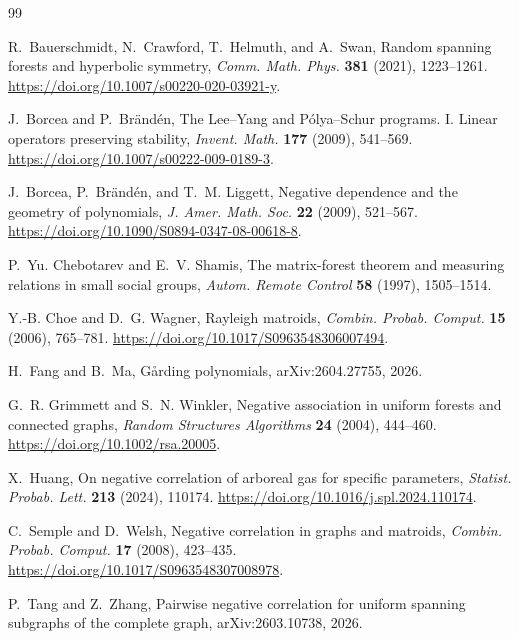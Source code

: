 \documentclass[11pt]{article}
\numberwithin{equation}{section}
\begin{document}
\begin{thebibliography}{99}

R.~Bauerschmidt, N.~Crawford, T.~Helmuth, and A.~Swan,
\newblock Random spanning forests and hyperbolic symmetry,
\newblock \emph{Comm. Math. Phys.} \textbf{381} (2021), 1223--1261.
\newblock \url{https://doi.org/10.1007/s00220-020-03921-y}.

J.~Borcea and P.~Br\"and\'en,
\newblock The Lee--Yang and P\'olya--Schur programs. I. Linear operators preserving stability,
\newblock \emph{Invent. Math.} \textbf{177} (2009), 541--569.
\newblock \url{https://doi.org/10.1007/s00222-009-0189-3}.

J.~Borcea, P.~Br\"and\'en, and T.~M. Liggett,
\newblock Negative dependence and the geometry of polynomials,
\newblock \emph{J. Amer. Math. Soc.} \textbf{22} (2009), 521--567.
\newblock \url{https://doi.org/10.1090/S0894-0347-08-00618-8}.

P.~Yu. Chebotarev and E.~V. Shamis,
\newblock The matrix-forest theorem and measuring relations in small social groups,
\newblock \emph{Autom. Remote Control} \textbf{58} (1997), 1505--1514.

Y.-B. Choe and D.~G. Wagner,
\newblock Rayleigh matroids,
\newblock \emph{Combin. Probab. Comput.} \textbf{15} (2006), 765--781.
\newblock \url{https://doi.org/10.1017/S0963548306007494}.

H.~Fang and B.~Ma,
\newblock G{\aa}rding polynomials,
\newblock arXiv:2604.27755, 2026.

G.~R. Grimmett and S.~N. Winkler,
\newblock Negative association in uniform forests and connected graphs,
\newblock \emph{Random Structures Algorithms} \textbf{24} (2004), 444--460.
\newblock \url{https://doi.org/10.1002/rsa.20005}.

X.~Huang,
\newblock On negative correlation of arboreal gas for specific parameters,
\newblock \emph{Statist. Probab. Lett.} \textbf{213} (2024), 110174.
\newblock \url{https://doi.org/10.1016/j.spl.2024.110174}.

C.~Semple and D.~Welsh,
\newblock Negative correlation in graphs and matroids,
\newblock \emph{Combin. Probab. Comput.} \textbf{17} (2008), 423--435.
\newblock \url{https://doi.org/10.1017/S0963548307008978}.

P.~Tang and Z.~Zhang,
\newblock Pairwise negative correlation for uniform spanning subgraphs of the complete graph,
\newblock arXiv:2603.10738, 2026.

\end{thebibliography}
\end{document}
